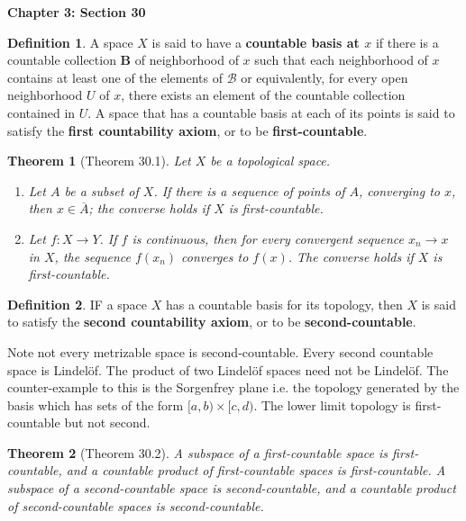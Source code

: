 \documentclass{article}
\newtheorem{theorem}{Theorem}
\theoremstyle{definition}
\newtheorem{definition}{Definition}[section]
\theoremstyle{remark}
\begin{document}
    \newpage

    \textbf{Chapter 3: Section 30}

    \begin{definition}
        A space $X$ is said to have a \textbf{countable basis at $x$} if there is a countable collection $\mathbf{B}$ of neighborhood
        of $x$ such that each neighborhood of $x$ contains at least one of the elements of $\mathcal{B}$ or equivalently, for every
        open neighborhood $U$ of $x$, there exists an element of the countable collection contained in $U$. A space that has a countable
        basis at each of its points is said to satisfy the \textbf{first countability axiom}, or to be \textbf{first-countable}.
    \end{definition}

    \begin{theorem}[Theorem 30.1]
        Let $X$ be a topological space.
        \begin{enumerate}
            \item Let $A$ be a subset of $X$. If there is a sequence of points of $A$, converging to $x$, then $x\in\overline{A}$;
                the converse holds if $X$ is first-countable.
            \item Let $f:X\to Y$. If $f$ is continuous, then for every convergent sequence $x_n\to x$ in $X$, the sequence $f(x_n)$
                converges to $f(x)$. The converse holds if $X$ is first-countable.
        \end{enumerate}
    \end{theorem}

    \begin{definition}
        IF a space $X$ has a countable basis for its topology, then $X$ is said to satisfy the \textbf{second countability axiom},
        or to be \textbf{second-countable}.
    \end{definition}
    Note not every metrizable space is second-countable. Every second countable space is Lindelöf. The product of two Lindelöf spaces
    need not be Lindelöf. The counter-example to this is the Sorgenfrey plane i.e. the topology generated by the basis which has
    sets of the form $[a,b)\times [c,d)$. The lower limit topology is first-countable but not second.

    \begin{theorem}[Theorem 30.2]
        A subspace of a first-countable space is first-countable, and a countable product of first-countable spaces is first-countable.
        A subspace of a second-countable space is second-countable, and a countable product of second-countable spaces is
        second-countable.
    \end{theorem}
\end{document}
